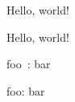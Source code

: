 

Hello, world!

\InterCharNodeOn
Hello, world!

\InterCharNodeOff

\hsize=1pt
foo\ : bar

\InterCharNodeOn
foo: bar

\InterCharNodeOff
\bye
